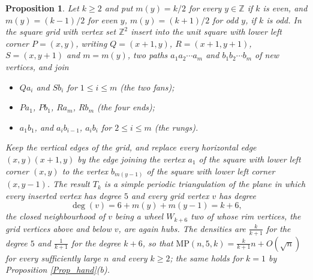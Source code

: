 \documentclass[10pt,a4paper]{article}
\newtheorem{proposition}[theorem]{Proposition}
\begin{document}
\begin{proposition}
\label{Prop_wheel}Let $k\geq 2$ and put $m(y)=k/2$ for every $y\in \mathbb{Z}$ if $k$ is even, and $m(y)=(k-1)/2$ for
even $y$, $m(y)=(k+1)/2$ for odd $y$, if $k$ is odd. In the square grid with vertex set $\mathbb{Z}^{2}$ insert into
the unit square with lower left corner $P=(x,y)$, writing $Q=(x+1,y)$, $R=(x+1,y+1)$, $S=(x,y+1)$ and $m=m(y)$, two
paths $a_{1}a_{2}\cdots a_{m}$ and $b_{1}b_{2}\cdots b_{m}$ of new vertices, and join

\begin{itemize}
\item[\textrm{(i)}] $Qa_{i}$ and $Sb_{i}$ for $1\leq i\leq m$ \emph{(the two fans)};
\item[\textrm{(ii)}] $Pa_{1}$, $Pb_{1}$, $Ra_{m}$, $Rb_{m}$ \emph{(the four ends)};
\item[\textrm{(iii)}] $a_{1}b_{1}$, and $a_{i}b_{i-1}$, $a_{i}b_{i}$ for $2\leq i\leq m$ \emph{(the rungs)}.
\end{itemize}

Keep the vertical edges of the grid, and replace every horizontal edge $(x,y)(x+1,y)$ by the edge joining the vertex
$a_{1}$ of the square with lower left corner $(x,y)$ to the vertex $b_{m(y-1)}$ of the square with lower left corner
$(x,y-1)$. The result $T_{k}$ is a simple periodic triangulation of the plane in which every inserted vertex has degree
$5$ and every grid vertex $v$ has degree
\[
\deg (v)=6+m(y)+m(y-1)=k+6 ,
\]
the closed neighbourhood of $v$ being a wheel $W_{k+6}$ two of whose rim vertices, the grid vertices above and below
$v$, are again hubs. The densities are $\frac{k}{k+1}$ for the degree $5$ and $\frac{1}{k+1}$ for the degree $k+6$,
so that $\mathrm{MP}(n,5,k)=\frac{k}{k+1}n+O(\sqrt{n})$ for every sufficiently large $n$ and every $k\geq 2$; the
same holds for $k=1$ by Proposition \ref{Prop_hand}(b).
\end{proposition}
\end{document}
